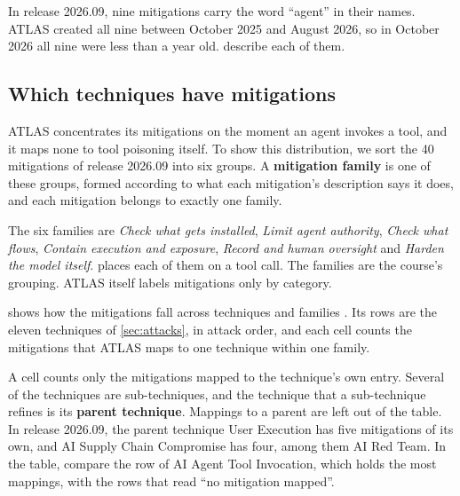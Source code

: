 In release 2026.09, nine mitigations carry the word ``agent'' in their names. ATLAS created all
nine between October 2025 and August 2026, so in October 2026 all nine were less than a year old.
 describe each
of them.

\subsection{Which techniques have mitigations}
\label{sec:mitigations-coverage}

ATLAS concentrates its mitigations on the moment an agent invokes a tool, and it maps none to tool
poisoning itself. To show this distribution, we sort the 40 mitigations of release 2026.09 into six
groups. A \textbf{mitigation family} is one of these groups, formed according to what each
mitigation's description says it does, and each mitigation belongs to exactly one family.

The six families are \emph{Check what gets installed}, \emph{Limit agent authority}, \emph{Check
what flows}, \emph{Contain execution and exposure}, \emph{Record and human oversight} and
\emph{Harden the model itself}.  places each of them on a tool call.
The families are the course's grouping. ATLAS itself labels mitigations only by category.

 shows how the mitigations fall across techniques and families
\citep{mitre-atlas-2026}. Its rows are the eleven techniques of \cref{sec:attacks}, in attack order,
and each cell counts the mitigations that ATLAS maps to one technique within one family.

A cell counts only the mitigations mapped to the technique's own entry. Several of the techniques
are sub-techniques, and the technique that a sub-technique refines is its \textbf{parent
technique}. Mappings to a parent are left out of the table. In release 2026.09, the parent
technique User Execution has five mitigations of its own, and AI Supply Chain Compromise has four,
among them AI Red Team. In the table, compare the row of AI Agent Tool Invocation, which holds the
most mappings, with the rows that read ``no mitigation mapped''.

